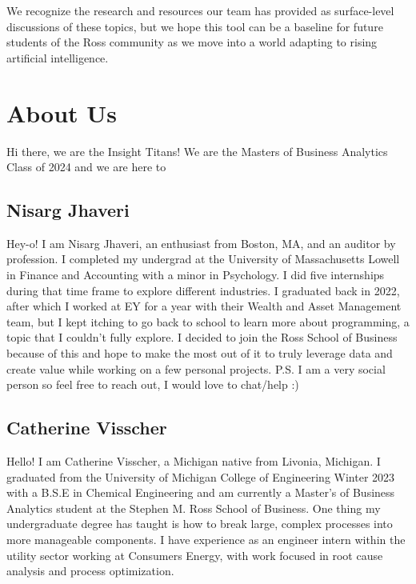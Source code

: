 \documentclass[
]{book}
\begin{document}
We recognize the research and resources our team has provided as surface-level discussions of these topics, but we hope this tool can be a baseline for future students of the Ross community as we move into a world adapting to rising artificial intelligence.

\hypertarget{about-us}{%
\chapter{About Us}\label{about-us}}

Hi there, we are the Insight Titans! We are the Masters of Business Analytics Class of 2024 and we are here to

\hypertarget{nisarg-jhaveri}{%
\section{Nisarg Jhaveri}\label{nisarg-jhaveri}}

Hey-o! I am Nisarg Jhaveri, an enthusiast from Boston, MA, and an auditor by profession. I completed my undergrad at the University of Massachusetts Lowell in Finance and Accounting with a minor in Psychology. I did five internships during that time frame to explore different industries. I graduated back in 2022, after which I worked at EY for a year with their Wealth and Asset Management team, but I kept itching to go back to school to learn more about programming, a topic that I couldn't fully explore.
I decided to join the Ross School of Business because of this and hope to make the most out of it to truly leverage data and create value while working on a few personal projects.
P.S. I am a very social person so feel free to reach out, I would love to chat/help :)

\hypertarget{catherine-visscher}{%
\section{Catherine Visscher}\label{catherine-visscher}}

Hello! I am Catherine Visscher, a Michigan native from Livonia, Michigan. I graduated from the University of Michigan College of Engineering Winter 2023 with a B.S.E in Chemical Engineering and am currently a Master's of Business Analytics student at the Stephen M. Ross School of Business. One thing my undergraduate degree has taught is how to break large, complex processes into more manageable components. I have experience as an engineer intern within the utility sector working at Consumers Energy, with work focused in root cause analysis and process optimization.
\end{document}
